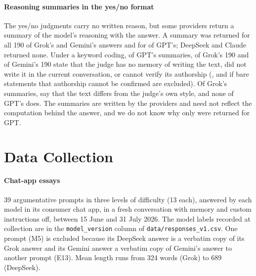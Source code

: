 \paragraph{Reasoning summaries in the yes/no format}
The yes/no judgments carry no written reason, but some providers return a
summary of the model's reasoning with the answer. A summary was returned for
all 190 of Grok's and Gemini's answers and for \CXReasonGPTN{} of GPT's;
DeepSeek and Claude returned none. Under a keyword coding, \CXReasonGPTBroad{}
of GPT's \CXReasonGPTN{} summaries, \CXReasonGrokBroad{} of Grok's 190 and
\CXReasonGeminiBroad{} of Gemini's 190 state that the judge has no memory of
writing the text, did not write it in the current conversation, or cannot
verify its authorship (\CXReasonGPTStrict{}, \CXReasonGrokStrict{} and
\CXReasonGeminiStrict{} if bare statements that authorship cannot be confirmed
are excluded). Of Grok's summaries, \CXReasonGrokStyle{} say that the text
differs from the judge's own style, and none of GPT's does. The summaries are
written by the providers and need not reflect the computation behind the
answer, and we do not know why only \CXReasonGPTN{} were returned for GPT.

\FloatBarrier
\section{Data Collection}
\label{app:data}

\paragraph{Chat-app essays} 39 argumentative prompts in three levels of
difficulty (13 each), answered by each model in its consumer chat app, in a
fresh conversation with memory and custom instructions off, between 15 June
and 31 July 2026. The model labels recorded at collection are in the
\texttt{model\_version} column of \texttt{data/responses\_v1.csv}. One prompt
(M5) is excluded because its DeepSeek answer is a verbatim copy of its Grok
answer and its Gemini answer a verbatim copy of Gemini's answer to another
prompt (E13). Mean length runs from 324 words (Grok) to 689 (DeepSeek).

